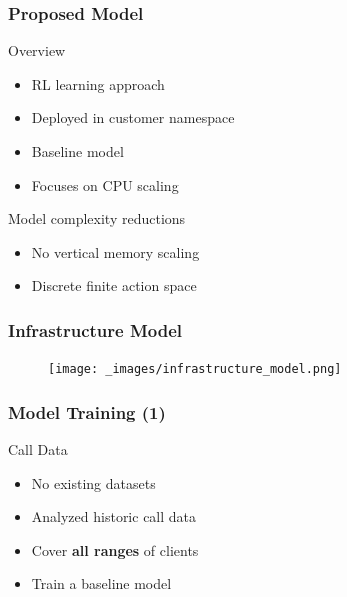 \documentclass[11pt,t,usepdftitle=false,aspectratio=169]{beamer}
\begin{document}
\begin{frame}
	\frametitle{Proposed Model}
	
	\begin{block}{Overview}
		\begin{itemize}
			\item RL learning approach
			\item Deployed in customer namespace
			\item Baseline model
			\item Focuses on CPU scaling
		\end{itemize}
	\end{block}
	
	\begin{alertblock}{Model complexity reductions}
		\begin{itemize}
			\item No vertical memory scaling
			\item Discrete finite action space
		\end{itemize}
	\end{alertblock}
\end{frame}

\begin{frame}
	\frametitle{Infrastructure Model}
	
	\begin{figure}
		\centering
		\vspace*{-0.4cm}
		\texttt{[image: \_images/infrastructure\_model.png]}
	\end{figure}
\end{frame}

\begin{frame}
	\frametitle{Model Training (1)}
	
	\begin{alertblock}{Call Data}
		\begin{itemize}
			\item No existing datasets
			\item Analyzed historic call data
			\item Cover \textbf{\color{red} all ranges} of clients
			\item Train a baseline model
		\end{itemize}
	\end{alertblock}
\end{frame}
\end{document}

